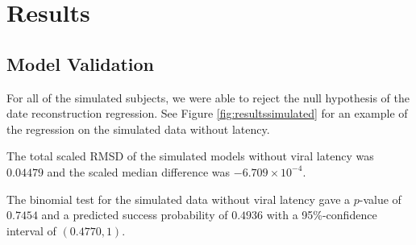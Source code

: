 \documentclass[12pt]{article}
\begin{document}


\section * {Results} \label{sec:results}


\subsection * {Model Validation} \label{sec:sim_results}
For all of the simulated subjects, we were able to reject the null hypothesis of the date reconstruction regression. See Figure \ref{fig:resultssimulated} for an example of the regression on the simulated data without latency.

The total scaled RMSD of the simulated models without viral latency was $0.04479$ and the scaled median difference was $-6.709 \times{} 10^{-4}$.

The binomial test for the simulated data without viral latency gave a $p$-value of $0.7454$ and a predicted success probability of $0.4936$ with a 95\%-confidence interval of $(0.4770, 1)$.

\end{document}

